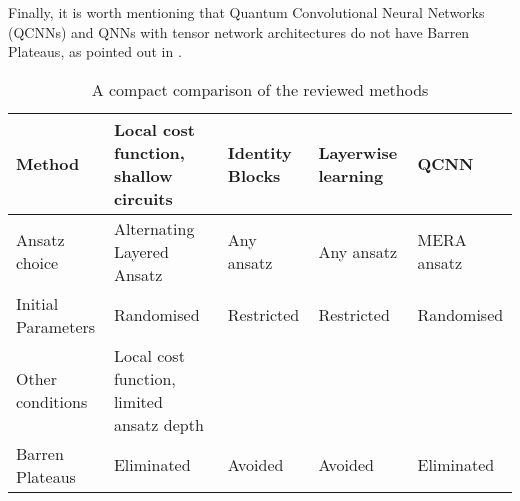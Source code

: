 Finally, it is worth mentioning that Quantum Convolutional Neural Networks (QCNNs) and QNNs with tensor network architectures do not have Barren Plateaus, as pointed out in \cite{congQuantumConvolutionalNeural2019}.

\begin{table}[]
    \centering
    \begin{tabular}{|p{2cm}|p{3cm}|p{3cm}|p{3cm}|p{3cm}|}
        \hline
        Method              & Local cost function, shallow circuits & Identity Blocks   & Layerwise learning    & QCNN \\
        \hline
        Ansatz choice       & Alternating Layered Ansatz            & Any ansatz        & Any ansatz            & MERA ansatz\\
        \hline
        Initial Parameters  & Randomised                            & Restricted        & Restricted            & Randomised \\
        \hline
        Other conditions    & Local cost function, limited ansatz depth &               &                       & \\
        \hline
        Barren Plateaus     & Eliminated                            & Avoided           & Avoided             & Eliminated \\
        \hline
    \end{tabular}
    \caption{A compact comparison of the reviewed methods}
    \label{quick comparison of methods}
\end{table}